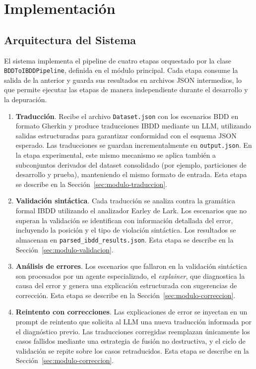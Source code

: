 \chapter{Implementación}

\section{Arquitectura del Sistema}
\label{sec:arquitectura}

El sistema implementa el pipeline de cuatro etapas orquestado por la clase
\texttt{BDDToIBDDPipeline}, definida en el módulo principal. Cada etapa consume la salida de la anterior y guarda sus resultados en archivos JSON intermedios, lo que permite ejecutar las etapas de manera independiente durante el desarrollo y la depuración.

\begin{enumerate}
  \item \textbf{Traducción}.
    Recibe el archivo \texttt{Dataset.json} con los escenarios BDD en formato Gherkin y produce traducciones IBDD mediante un LLM, utilizando salidas estructuradas para garantizar conformidad con el esquema JSON esperado. Las traducciones se guardan incrementalmente en
    \texttt{output.json}.
    En la etapa experimental, este mismo mecanismo se aplica también a subconjuntos derivados del dataset consolidado (por ejemplo, particiones de desarrollo y prueba), manteniendo el mismo formato de entrada.
    Esta etapa se describe en la Sección~\ref{sec:modulo-traduccion}.

  \item \textbf{Validación sintáctica}.
    Cada traducción se analiza contra la gramática formal IBDD utilizando el analizador Earley de Lark. Los escenarios que no superan la validación se identifican con información detallada del error, incluyendo la posición y el tipo de violación sintáctica. Los resultados se almacenan en
    \texttt{parsed\_ibdd\_results.json}.
    Esta etapa se describe en la Sección~\ref{sec:modulo-validacion}.

  \item \textbf{Análisis de errores}.
    Los escenarios que fallaron en la validación sintáctica son procesados por un agente especializado, el \textit{explainer}, que diagnostica la causa del error y genera una explicación estructurada con sugerencias de corrección.
    Esta etapa se describe en la Sección~\ref{sec:modulo-correccion}.

  \item \textbf{Reintento con correcciones}.
    Las explicaciones de error se inyectan en un prompt de reintento que solicita al LLM una nueva traducción informada por el diagnóstico previo. Las traducciones corregidas reemplazan únicamente los casos fallidos mediante una estrategia de fusión no destructiva, y el ciclo de validación se repite sobre los casos retraducidos.
    Esta etapa se describe en la Sección~\ref{sec:modulo-correccion}.
\end{enumerate}

